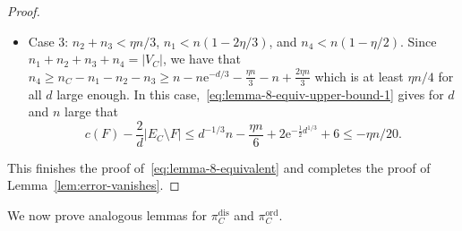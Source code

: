 \documentclass[11pt]{article}
\theoremstyle{plain}
\newcommand{\emm}{\mathrm{e}}
\newcommand{\1}{\mathbb{1}}
\newcommand{\ord}{\mathrm{ord}}
\newcommand{\dis}{\mathrm{dis}}
\begin{document}
\begin{proof}
\begin{itemize}
        \item Case 3: \(n_2 + n_3 < \eta n / 3\), \(n_1 < n(1-2\eta/3)\), and \(n_4 < n(1-\eta/2)\). Since \(n_1 + n_2 + n_3 + n_4 = |V_C|\), we have that \(n_4\geq n_C - n_1 - n_2 - n_3 \geq n - n\emm^{-d/3} - \frac{\eta n}{3} - n + \tfrac{2\eta n}{3}\) which is at least \(\eta n / 4\) for all \(d\) large enough. In this case,~\eqref{eq:lemma-8-equiv-upper-bound-1} gives for $d$ and $n$ large that
        \[
        c(F) - \frac{2}{d}|E_C\setminus F|\leq d^{-1/3}n - \frac{\eta n}{6}+2\emm^{-\tfrac{1}{2}d^{1/3}}+6\leq -\eta n /20.
        \]
    \end{itemize}
    This finishes the proof of~\eqref{eq:lemma-8-equivalent} and completes the proof of Lemma~\ref{lem:error-vanishes}.
\end{proof}

We now prove analogous lemmas for \(\pi^\dis_C\) and \(\pi^\ord_C\). 
\end{document}
